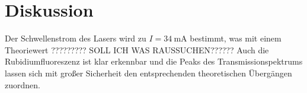 \section{Diskussion}
\label{sec:Diskussion}
Der Schwellenstrom des Lasers wird zu $I=\qty{34}{\milli\ampere}$ bestimmt, was mit einem Theoriewert ????????? SOLL ICH WAS RAUSSUCHEN??????
Auch die Rubidiumfluoreszenz ist klar erkennbar und die Peaks des Transmissionspektrums lassen sich mit großer Sicherheit den entsprechenden
theoretischen Übergängen zuordnen.
